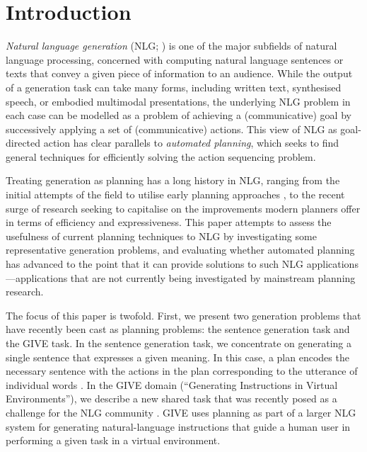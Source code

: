 \section{Introduction}
\label{sec:introduction}

\emph{Natural language generation} (NLG; \citealp{reiter00building}) is one of
the major subfields of natural language processing, concerned with computing
natural language sentences or texts that convey a given piece of information to
an audience. While the output of a generation task can take many forms,
including written text, synthesised speech, or embodied multimodal
presentations, the underlying NLG problem in each case can be modelled as a
problem of achieving a (communicative) goal by successively applying a set of
(communicative) actions. This view of NLG as goal-directed action has clear
parallels to \emph{automated planning}, which seeks to find general techniques
for efficiently solving the action sequencing problem.

Treating generation as planning has a long history in NLG, ranging from the
initial attempts of the field to utilise early planning approaches
\citep{perrault80,appelt:planning,hovy88,young94dpocl}, to the recent surge of
research \citep{Steedman-Petrick:07,KolSto07,benotti08b} seeking to capitalise
on the improvements modern planners offer in terms of efficiency and
expressiveness. This paper attempts to assess the usefulness of current planning
techniques to NLG by investigating some representative generation problems, and
evaluating whether automated planning has advanced to the point that it can
provide solutions to such NLG applications---applications that are not currently
being investigated by mainstream planning research.

The focus of this paper is twofold. First, we present two generation problems
that have recently been cast as planning problems: the sentence generation task
and the GIVE task. In the sentence generation task, we concentrate on generating
a single sentence that expresses a given meaning. In this case, a plan encodes
the necessary sentence with the actions in the plan corresponding to the
utterance of individual words \citep{KolSto07}. In the GIVE domain (``Generating
Instructions in Virtual Environments''), we describe a new shared task that was
recently posed as a challenge for the NLG community
\citep{ByrKolStrCasDalMooObe09}. GIVE uses planning as part of a larger NLG
system for generating natural-language instructions that guide a human user in
performing a given task in a virtual environment.

